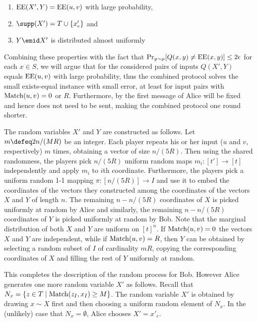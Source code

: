 \begin{enumerate}[(P1)]
\item $\operatorname{EE}(X',Y)=\operatorname{EE}(u,v)$ with large probability,
\label{prop:2}
\item $\supp(X')=T\cup \{x'_e\}$ and
\label{prop:3}
\item $Y\emid X'$ is distributed almost uniformly
\label{prop:4}
\end{enumerate}

Combining these properties with the fact that $\Pr_{y\sim
\mu}[Q(x,y)\neq\operatorname{EE}(x,y)]\leq 2\epsilon$ for each $x\in S$, we
will argue that for the considered pairs of inputs $Q(X',Y)$
equals $\operatorname{EE}(u,v)$ with large probability, thus the combined
protocol solves the small exists-equal instance with small
error, at least for input pairs with $\operatorname{Match}(u,v)=0$ or $R$.
Furthermore, by  the first message of Alice will
be fixed and hence does not need to be sent, making the combined
protocol one round shorter.

The random variables $X'$ and $Y$ are constructed as follows.
Let $m\defeq 2n/(MR)$ be an integer. Each player repeats his or
her input ($u$ and $v$, respectively) $m$ times, obtaining a
vector of size $n/(5R)$. Then using the shared randomness, the
players pick $n/(5R)$ uniform random maps $m_i\colon[t']\to[t]$
independently and apply $m_i$ to $i$\/th coordinate.
Furthermore, the players pick a uniform random 1-1 mapping
$\pi\colon[n/(5R)]\to I$ and use it to embed the coordinates of the
vectors they constructed among the coordinates of the vectors
$X$ and $Y$ of length $n$. The remaining $n-n/(5R)$ coordinates
of $X$ is picked uniformly at random by Alice and similarly, the
remaining $n-n/(5R)$ coordinates of $Y$ is picked uniformly at
random by Bob. Note that the marginal distribution of both $X$
and $Y$ are uniform on $[t]^n$. If $\operatorname{Match}(u,v)=0$ the vectors
$X$ and $Y$ are independent, while if $\operatorname{Match}(u,v)=R$, then $Y$
can be obtained by selecting a random subset of $I$ of
cardinality $mR$, copying the corresponding coordinates of $X$
and filling the rest of $Y$ uniformly at random.

This completes the description of the random process for Bob.
However Alice generates one more random variable $X'$ as
follows. Recall that $N_x=\{z\in T\mid\operatorname{Match}(z_I,x_I)\ge M\}$.
The random variable $X'$ is obtained by drawing $x\sim X$ first
and then choosing a uniform random element of $N_x$. In the
(unlikely) case that $N_x=\emptyset$, Alice chooses $X'=x'_e$.

